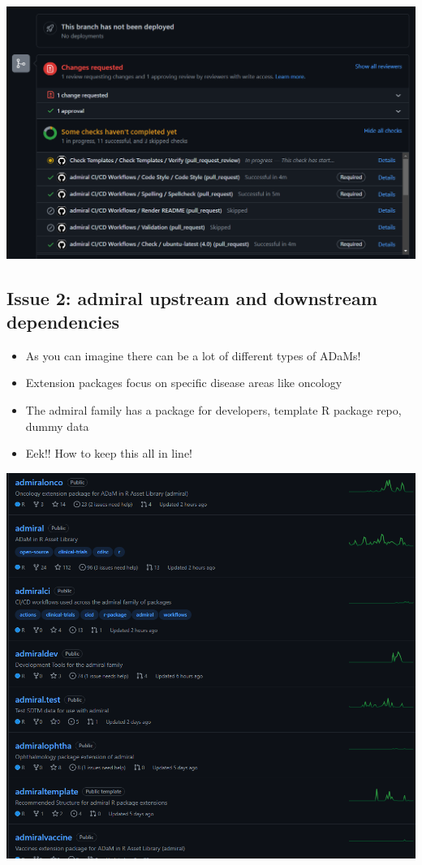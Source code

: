 \documentclass[
  letterpaper,
  DIV=11,
  numbers=noendperiod]{scrartcl}
\providecommand{\tightlist}{%
  \setlength{\itemsep}{0pt}\setlength{\parskip}{0pt}}\usepackage{longtable,booktabs,array}
\begin{document}
\includegraphics{template_review.png}

\hypertarget{issue-2-admiral-upstream-and-downstream-dependencies}{%
\subsection{Issue 2: admiral upstream and downstream
dependencies}\label{issue-2-admiral-upstream-and-downstream-dependencies}}

\begin{itemize}
\tightlist
\item
  As you can imagine there can be a lot of different types of ADaMs!
\item
  Extension packages focus on specific disease areas like oncology
\item
  The admiral family has a package for developers, template R package
  repo, dummy data
\item
  Eek!! How to keep this all in line!
\end{itemize}

\includegraphics{admiralext.png}
\end{document}

